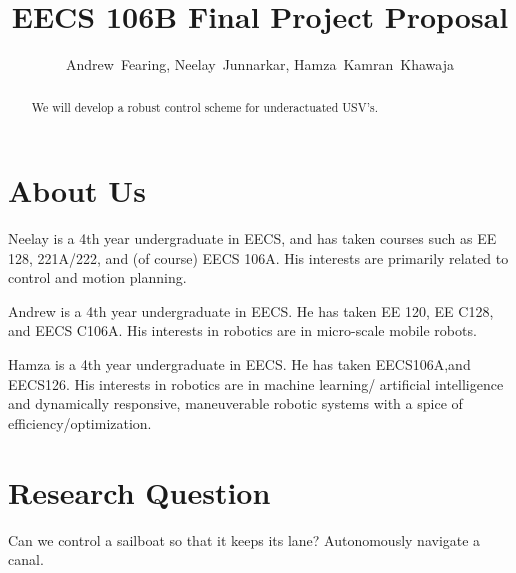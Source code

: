 \documentclass[conference]{IEEEtran}
\begin{document}
\title{EECS 106B Final Project Proposal}
\author{Andrew~Fearing, Neelay~Junnarkar,  Hamza~Kamran~Khawaja}
\maketitle


\begin{abstract}
We will develop a robust control scheme for underactuated USV's.
\end{abstract}


\section{About Us}
Neelay is a 4th year undergraduate in EECS, and has taken courses such as EE 128, 221A/222, and (of course) EECS 106A. His interests are primarily related to control and motion planning.

Andrew is a 4th year undergraduate in EECS. He has taken EE 120, EE C128, and EECS C106A. His interests in robotics are in micro-scale mobile robots.

Hamza is a 4th year undergraduate in EECS. He has taken EECS106A,and EECS126. His interests in robotics are in machine learning/ artificial intelligence and dynamically responsive, maneuverable robotic systems with a spice of efficiency/optimization.
\section{Research Question}
Can we control a sailboat so that it keeps its lane? Autonomously navigate a canal.
\end{document}
